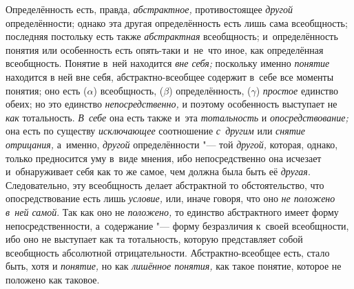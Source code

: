 Определённость есть, правда, {\em абстрактное,} противостоящее {\em другой}
определённости; однако эта другая определённость есть лишь
сама всеобщность; последняя постольку есть также {\em абстрактная}
всеобщность; и~определённость понятия или особенность есть
опять-таки и~не~что иное, как определённая всеобщность. Понятие в~ней
находится {\em вне себя;} поскольку именно {\em понятие} находится в
ней вне себя, абстрактно-всеобщее содержит в~себе все моменты понятия; оно
есть ($\alpha $) всеобщность, ($\beta $) определённость, ($\gamma $)
{\em простое} единство обеих; но это единство {\em непосредственно,} и
поэтому особенность выступает не {\em как} тотальность. {\em В~себе} она есть
также и~эта {\em тотальность} и {\em опосредствование;}
она есть по существу {\em исключающее} соотношение {\em с~другим} или
{\em снятие отрицания,} а~именно, {\em другой} определённости "--- той
{\em другой,} которая, однако, только предносится уму в~виде мнения, ибо
непосредственно она исчезает и~обнаруживает себя как то же самое, чем должна
была быть её {\em другая}. Следовательно, эту всеобщность делает абстрактной
то обстоятельство, что опосредствование есть лишь {\em условие,} или, иначе
говоря, что оно {\em не положено в~ней самой}. Так как оно не {\em положено,}
то единство абстрактного имеет форму непосредственности, а~содержание
"--- форму безразличия к~своей всеобщности, ибо оно не выступает
как та тотальность, которую представляет собой всеобщность абсолютной
отрицательности. Абстрактно-всеобщее есть, стало быть, хотя и
{\em понятие,} но как {\em лишённое понятия,}
как такое понятие, которое не положено как таковое.

